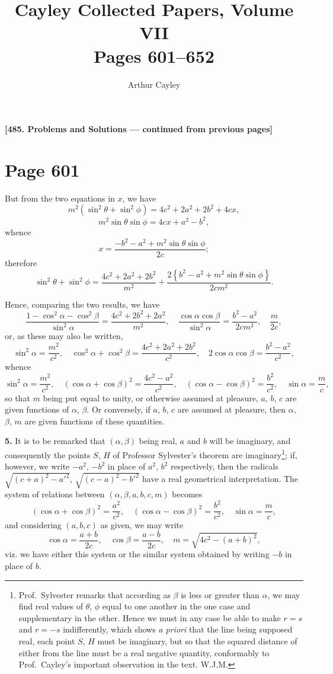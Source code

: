 \documentclass[12pt,a4paper]{article}
\title{Cayley Collected Papers, Volume VII\\Pages 601--652}
\author{Arthur Cayley}
\date{}
\theoremstyle{plain}
\theoremstyle{definition}
\theoremstyle{remark}
\begin{document}
\maketitle

\noindent\textbf{[485. Problems and Solutions --- continued from previous pages]}

\section*{Page 601}
\setcounter{page}{601}

But from the two equations in $x$, we have
\[
m^2(\sin^2\theta + \sin^2\phi) = 4c^2 + 2a^2 + 2b^2 + 4cx,
\]
\[
m^2\sin\theta\sin\phi = 4cx + a^2 - b^2,
\]
whence
\[
x = \frac{-b^2 - a^2 + m^2\sin\theta\sin\phi}{2c};
\]
therefore
\[
\sin^2\theta + \sin^2\phi = \frac{4c^2 + 2a^2 + 2b^2}{m^2} + \frac{2\left\{b^2 - a^2 + m^2\sin\theta\sin\phi\right\}}{2cm^2}.
\]

Hence, comparing the two results, we have
\[
\frac{1 - \cos^2\alpha - \cos^2\beta}{\sin^2\alpha} = \frac{4c^2 + 2b^2 + 2a^2}{m^2}, \quad
\frac{\cos\alpha\cos\beta}{\sin^2\alpha} = \frac{b^2 - a^2}{2cm^2}, \quad
\frac{m}{2c},
\]
or, as these may also be written,
\[
\sin^2\alpha = \frac{m^2}{c^2}, \quad
\cos^2\alpha + \cos^2\beta = \frac{4c^2 + 2a^2 + 2b^2}{c^2}, \quad
2\cos\alpha\cos\beta = \frac{b^2 - a^2}{c^2},
\]
whence
\[
\sin^2\alpha = \frac{m^2}{c^2}, \quad
(\cos\alpha + \cos\beta)^2 = \frac{4c^2 - a^2}{c^2}, \quad
(\cos\alpha - \cos\beta)^2 = \frac{b^2}{c^2}, \quad
\sin\alpha = \frac{m}{c},
\]
so that $m$ being put equal to unity, or otherwise assumed at pleasure, $a$, $b$, $c$ are given functions of $\alpha$, $\beta$. Or conversely, if $a$, $b$, $c$ are assumed at pleasure, then $\alpha$, $\beta$, $m$ are given functions of these quantities.

\medskip\noindent\textbf{5.} It is to be remarked that $(\alpha, \beta)$ being real, $a$ and $b$ will be imaginary, and consequently the points $S$, $H$ of Professor Sylvester's theorem are imaginary\footnote{Prof.~Sylvester remarks that according as $\beta$ is less or greater than $\alpha$, we may find real values of $\theta$, $\phi$ equal to one another in the one case and supplementary in the other. Hence we must in any case be able to make $r = s$ and $r = -s$ indifferently, which shows \textit{a priori} that the line being supposed real, each point $S$, $H$ must be imaginary, but so that the squared distance of either from the line must be a real negative quantity, conformably to Prof.~Cayley's important observation in the text. W.J.M.}; if, however, we write $-a^2$, $-b^2$ in place of $a^2$, $b^2$ respectively, then the radicals $\sqrt{(c+a)^2 - a'^2}$, $\sqrt{(c-a)^2 - b'^2}$ have a real geometrical interpretation. The system of relations between $(\alpha, \beta, a, b, c, m)$ becomes
\[
(\cos\alpha + \cos\beta)^2 = \frac{a^2}{c^2}, \quad
(\cos\alpha - \cos\beta)^2 = \frac{b^2}{c^2}, \quad
\sin\alpha = \frac{m}{c},
\]
and considering $(a, b, c)$ as given, we may write
\[
\cos\alpha = \frac{a + b}{2c}, \quad
\cos\beta = \frac{a - b}{2c}, \quad
m = \sqrt{4c^2 - (a + b)^2},
\]
viz. we have either this system or the similar system obtained by writing $-b$ in place of $b$.
\end{document}
